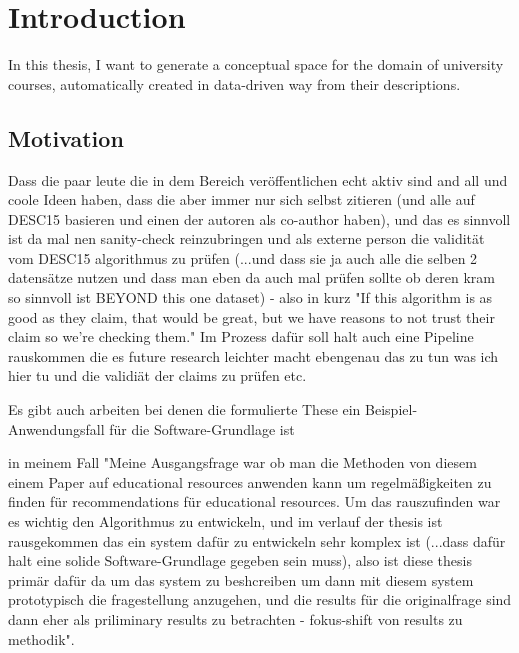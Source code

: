 \chapter{Introduction}

In this thesis, I want to generate a conceptual space for the domain of university courses, automatically created in data-driven way from their descriptions.

\section{Motivation}


Dass die paar leute die in dem Bereich veröffentlichen echt aktiv sind and all und coole Ideen haben, dass die aber immer nur sich selbst zitieren (und alle auf DESC15 basieren und einen der autoren als co-author haben), und das es sinnvoll ist da mal nen sanity-check reinzubringen und als externe person die validität vom DESC15 algorithmus zu prüfen (...und dass sie ja auch alle die selben 2 datensätze nutzen und dass man eben da auch mal prüfen sollte ob deren kram so sinnvoll ist BEYOND this one dataset) - also in kurz "If this algorithm is as good as they claim, that would be great, but we have reasons to not trust their claim so we're checking them." Im Prozess dafür soll halt auch eine Pipeline rauskommen die es future research leichter macht ebengenau das zu tun was ich hier tu und die validiät der claims zu prüfen etc.

Es gibt auch arbeiten bei denen die formulierte These ein Beispiel-Anwendungsfall für die Software-Grundlage ist

in meinem Fall "Meine Ausgangsfrage war ob man die Methoden von diesem einem Paper auf educational resources anwenden kann um regelmäßigkeiten zu finden für recommendations für educational resources. Um das rauszufinden war es wichtig den Algorithmus zu entwickeln, und im verlauf der thesis ist rausgekommen das ein system dafür zu entwickeln sehr komplex ist (...dass dafür halt eine solide Software-Grundlage gegeben sein muss), also ist diese thesis primär dafür da um das system zu beshcreiben um dann mit diesem system prototypisch die fragestellung anzugehen, und die results für die originalfrage sind dann eher als priliminary results zu betrachten - fokus-shift von results zu methodik".

